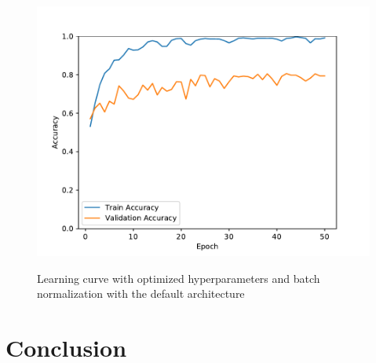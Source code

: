 \documentclass{article}
\begin{document}
\begin{figure}
  \centering
  \includegraphics[width=\linewidth]{figures/default_bn.pdf}\label{fig:default}
  \caption{Learning curve with optimized hyperparameters and batch
    normalization with the default architecture}
\end{figure}


\section{Conclusion}\label{sec:conclusion}

\small




%

\vfill\pagebreak
\end{document}
